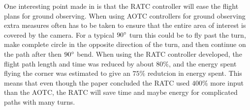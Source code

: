 One interesting point made in \cite{ratcFISHER} is that the RATC controller will ease the flight plans for ground observing. When using AOTC controllers for ground observing extra measures often has to be taken to ensure that the entire area of interest is covered by the camera. For a typical $90 \degree$ turn this could be to fly past the turn, make complete circle in the opposite direction of the turn, and then continue on the path after then $90 \degree$ bend. When using the RATC controller developed, the flight path length and time was reduced by about $80 \%$, and the energy spent flying the corner was estimated to give an $75 \%$ redutcion in energy spent. This means that even though the paper concluded the RATC used $400 \%$ more input than the AOTC, the RATC will save time and maybe energy for complicated paths with many turns.